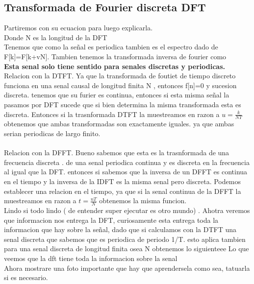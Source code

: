 \subsection{Transformada de Fourier discreta DFT}
Partiremos con su ecuacion para luego explicarla.  \\ Donde N es la longitud de la DFT \\
Tenemos que como la señal es periodica tambien es el espectro dado de F[k]=F[k+vN]. Tambien tenemos la transformada inversa de fourier como 
\\ \textbf{ Esta senal solo tiene sentido para senales discretas y periodicas.}
\\ Relacion con la DTFT. Ya que la transformada de foutiet de tiempo discreto funciona en una senal causal de longitud finita N , entonces f[n]=0 y sucesion discreta. tenemos que su furier es continua, entonces si esta misma señal la pasamos por DFT sucede que si bien determina la misma transformada esta es discreta. Entonces si la trasnformada DTFT la muestreamos en razon a  $u=\frac{k}{NT}$ obtenemos que ambas transformadas son exactamente iguales. ya que ambas serian periodicas de largo finito.\\
\\ Relacion con la DFFT. Bueno sabemos que esta es la trasnformada de una frecuencia discreta . de una senal periodica continua y es discreta en la frecuencia al igual que la DFT. entonces  si sabemos que la inversa de un DFFT es continua en el tiempo y la inversa de la IDFT es la misma senal pero discreta. Podemos establecer una relacion en el tiempo, ya que si la senal continua de la DFFT la muestreamos en razon a $t=\frac{nT}{N}$ obtenemos la misma funcion.
\\ Lindo si todo lindo ( de entender super ejecutar es otro mundo) . Ahotra veremos que informacion nos entrega la DFT, curiosamente esta entrega toda la informacion que hay sobre la señal, dado que si calculamos con la DTFT una senal discreta que sabemos que es periodica de periodo 1/T. esto aplica tambien para una senal discreta de longitud finita osea N obtenemos lo siguienteee
Lo que veemos que la dft tiene toda la informacion sobre la senal
\\ Ahora mostrare una foto importante que hay que aprendersela como sea, tatuarla si es necesario.
